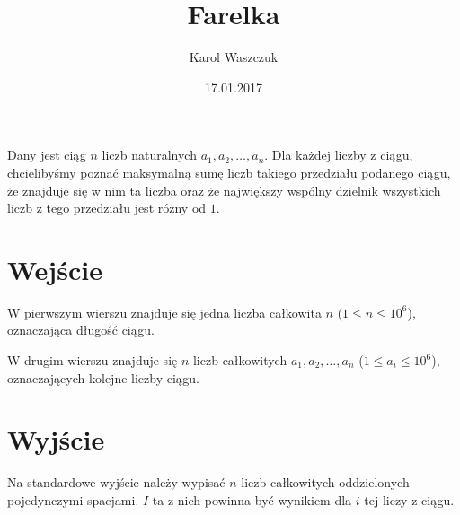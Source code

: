 \documentclass[zad,zawodnik,utf8]{sinol}
\title{Farelka}
\author{Karol Waszczuk} %
\date{17.01.2017}
\begin{document}
\begin{tasktext}%

Dany jest ciąg $n$ liczb naturalnych $a_1, a_2, \dots, a_n$. Dla każdej liczby z ciągu, chcielibyśmy poznać maksymalną sumę liczb takiego przedziału podanego ciągu, 
że znajduje się w nim ta liczba oraz że największy wspólny dzielnik wszystkich liczb z tego przedziału jest różny od $1$.

  \section{Wejście}

W pierwszym wierszu znajduje się jedna liczba całkowita $n$ ($1 \leq n \leq 10^6$), oznaczająca długość ciągu.

W drugim wierszu znajduje się $n$ liczb całkowitych $a_1, a_2, \dots, a_n$ ($1 \leq a_i \leq 10^6$), oznaczających kolejne liczby ciągu.

  \section{Wyjście}
Na standardowe wyjście należy wypisać $n$ liczb całkowitych oddzielonych pojedynczymi spacjami. $I$-ta z nich powinna być wynikiem dla $i$-tej liczy z ciągu.

\makecompactexample
\end{tasktext}
\end{document}
